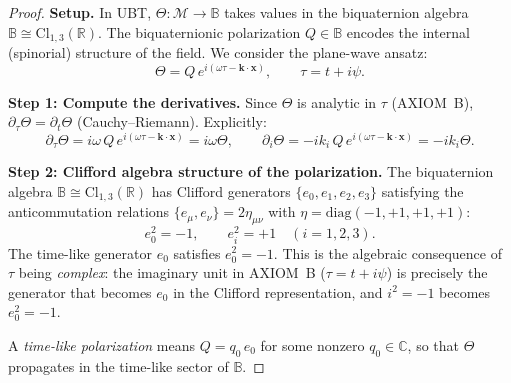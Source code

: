 \documentclass[12pt]{article}
\theoremstyle{definition}
\theoremstyle{remark}
\begin{document}
\begin{proof}
\textbf{Setup.}
In UBT, $\Theta : \mathcal{M}\to\mathbb{B}$ takes values in the biquaternion algebra
$\mathbb{B}\cong\mathrm{Cl}_{1,3}(\mathbb{R})$.  The biquaternionic polarization
$Q\in\mathbb{B}$ encodes the internal (spinorial) structure of the field.  We consider
the plane-wave ansatz:
\[
  \Theta = Q\,e^{i(\omega\tau - \mathbf{k}\cdot\mathbf{x})},
  \qquad \tau = t + i\psi.
\]

\textbf{Step 1: Compute the derivatives.}
Since $\Theta$ is analytic in $\tau$ (AXIOM~B), $\partial_\tau\Theta = \partial_t\Theta$
(Cauchy--Riemann).  Explicitly:
\begin{equation}
  \partial_\tau\Theta = i\omega\,Q\,e^{i(\omega\tau - \mathbf{k}\cdot\mathbf{x})} = i\omega\Theta,
  \qquad
  \partial_i\Theta = -ik_i\,Q\,e^{i(\omega\tau - \mathbf{k}\cdot\mathbf{x})} = -ik_i\Theta.
  \label{eq:axiomB_derivs}
\end{equation}

\textbf{Step 2: Clifford algebra structure of the polarization.}
The biquaternion algebra $\mathbb{B}\cong\mathrm{Cl}_{1,3}(\mathbb{R})$ has Clifford
generators $\{e_0, e_1, e_2, e_3\}$ satisfying the anticommutation relations
$\{e_\mu, e_\nu\} = 2\eta_{\mu\nu}$ with $\eta = \mathrm{diag}(-1,+1,+1,+1)$:
\begin{equation}
  e_0^2 = -1, \qquad e_i^2 = +1 \quad(i=1,2,3).
  \label{eq:clifford_sq}
\end{equation}
The time-like generator $e_0$ satisfies $e_0^2 = -1$.  This is the algebraic
consequence of $\tau$ being \emph{complex}: the imaginary unit in AXIOM~B
($\tau = t + i\psi$) is precisely the generator that becomes $e_0$ in the
Clifford representation, and $i^2 = -1$ becomes $e_0^2 = -1$.

A \emph{time-like polarization} means $Q = q_0\,e_0$ for some nonzero
$q_0\in\mathbb{C}$, so that $\Theta$ propagates in the time-like sector of $\mathbb{B}$.


\end{proof}
\end{document}
